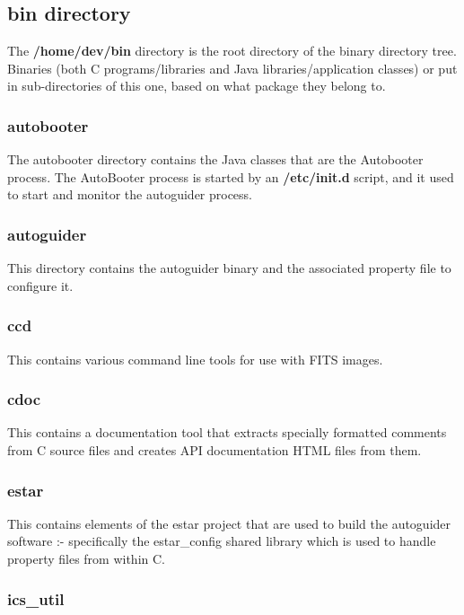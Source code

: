 \documentclass[10pt,a4paper]{article}
\begin{document}
\subsection{bin directory}

The {\bf /home/dev/bin} directory is the root directory of the binary directory tree. Binaries (both C programs/libraries and Java libraries/application classes) or put in sub-directories of this one, based on what package they belong to.

\subsubsection{autobooter}

The autobooter directory contains the Java classes that are the Autobooter process. The AutoBooter process is started by an {\bf /etc/init.d} script, and it used to start and monitor the autoguider process.

\subsubsection{autoguider}

This directory contains the autoguider binary and the associated property file to configure it.

\subsubsection{ccd}

This contains various command line tools for use with FITS images.

\subsubsection{cdoc}

This contains a documentation tool that extracts specially formatted comments from C source files and creates API documentation HTML files from them.

\subsubsection{estar}

This contains elements of the estar project that are used to build the autoguider software :- specifically the estar\_config shared library which is used to handle property files from within C.

\subsubsection{ics\_util}
\end{document}
